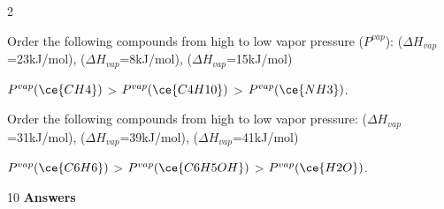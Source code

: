 \documentclass[main.tex]{subfiles}
\begin{document}
\begin{multicols*}{2}
\begin{question}[ID=\the\value{numA}]
Order the following compounds from high to low vapor pressure ($P^{vap}$):  ($\Delta H_{vap}$=23kJ/mol),  ($\Delta H_{vap}$=8kJ/mol),  ($\Delta H_{vap}$=15kJ/mol)
\end{question}
\begin{solution}
$P^{vap}(\ce{CH4})$ > $P^{vap}(\ce{C4H10})$ > $P^{vap}(\ce{NH3})$.  
 \hspace{0.1cm}\end{solution}
\begin{question}[ID=\the\value{numA}]
Order the following compounds from high to low vapor pressure:  ($\Delta H_{vap}$=31kJ/mol),  ($\Delta H_{vap}$=39kJ/mol),  ($\Delta H_{vap}$=41kJ/mol)
\end{question}
\begin{solution}
$P^{vap}(\ce{C6H6})$ > $P^{vap}(\ce{C6H5OH})$ > $P^{vap}(\ce{H2O})$.  
 \hspace{0.1cm}\end{solution}









\end{multicols*}
\newpage
\begin{answersenvironment}
\begin{minipage}[c]{1\textwidth}
\begin{localsize}{10}
{\Large \bf Answers}
\printsolutions[byID={1,3,5,7,9,11,13,15,17, 19,21,23,25,27, 29}]
\end{localsize}
\end{minipage}\end{answersenvironment}
 \clearpage\thispagestyle{empty}\mbox{}
\end{document}
